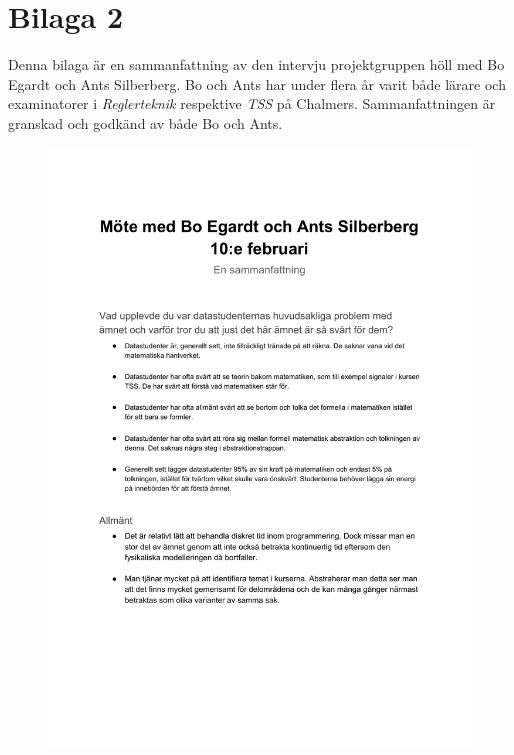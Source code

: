 \documentclass[12pt,a4paper,twoside,openright]{article}
\begin{document}
\section{Bilaga 2}
\label{bil:exam_intervju}
Denna bilaga är en sammanfattning av den intervju projektgruppen höll
med Bo Egardt och Ants Silberberg. Bo och Ants har under flera år
varit både lärare och examinatorer i \textit{Reglerteknik} respektive
\textit{TSS} på Chalmers. Sammanfattningen är granskad och godkänd av
både Bo och Ants.
\begin{figure}
  \centerline{\includegraphics[page=1]{Bilagor/Bilaga2.pdf}}
\end{figure}
\newpage
\end{document}
